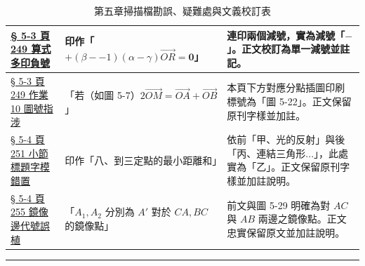 \documentclass[a4paper,12pt,twoside]{article}
\begin{document}
\begin{table}[H]
\begin{tabularx}{\textwidth}{|p{3.2cm}|p{3.8cm}|X|}
\hyperref[note:b3-ch5-p249-double-minus]{§ 5-3 頁 249 算式多印負號} & 
印作「$+(\beta--1)(\alpha-\gamma)\vec{OR} = \mathbf{0}$」 & 
連印兩個減號，實為減號「$-$」。正文校訂為單一減號並註記。 \\ \hline

\hyperref[note:b3-ch5-p249-fig-ref]{§ 5-3 頁 249 作業 10 圖號指涉} & 
「若（如圖 5-7）$2\vec{OM} = \vec{OA} + \vec{OB}$」 & 
本頁下方對應分點插圖印刷標號為「圖 5-22」。正文保留原刊字樣並加註。 \\ \hline

\hyperref[note:b3-ch5-p251-sec-title]{§ 5-4 頁 251 小節標題字模錯置} & 
印作「八、到三定點的最小距離和」 & 
依前「甲、光的反射」與後「丙、連結三角形...」，此處實為「乙」。正文保留原刊字樣並加註說明。 \\ \hline

\hyperref[note:b3-ch5-p255-mirror-line]{§ 5-4 頁 255 鏡像邊代號誤植} & 
「$A_1, A_2$ 分別為 $A'$ 對於 $CA, BC$ 的鏡像點」 & 
前文與圖 5-29 明確為對 $AC$ 與 $AB$ 兩邊之鏡像點。正文忠實保留原文並加註說明。 \\ \hline

\end{tabularx}
\caption{第五章掃描檔勘誤、疑難處與文義校訂表}
\label{tab:errata_b3_ch5}
\end{table}

\vspace{1em}
\hrule
\vspace{1em}

\tableofcontents
\newpage

\setcounter{section}{4}

\end{document}

